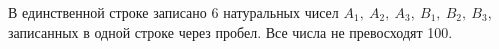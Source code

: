 В единственной строке записано 6 натуральных чисел $A_1,~A_2,~A_3,~B_1,~B_2,~B_3$, записанных в одной строке через пробел. Все числа не превосходят 100.
